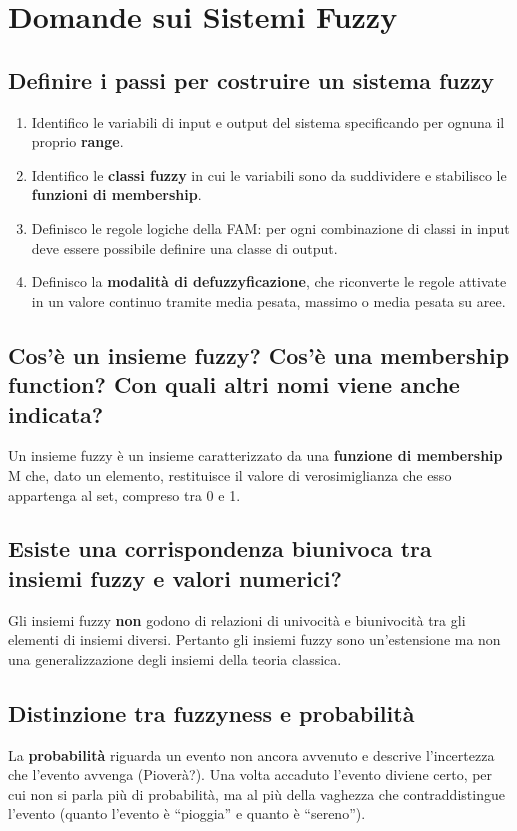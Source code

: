 \documentclass[\main/main.tex]{subfiles}
\begin{document}
\section{Domande sui Sistemi Fuzzy}
\subsection{Definire i passi per costruire un sistema fuzzy}
\begin{enumerate}
  \item Identifico le variabili di input e output del sistema specificando per ognuna il proprio \textbf{range}.
  \item Identifico le \textbf{classi fuzzy} in cui le variabili sono da suddividere e stabilisco le \textbf{funzioni di membership}.
  \item Definisco le regole logiche della FAM: per ogni combinazione di classi in input deve essere possibile definire una classe di output.
  \item Definisco la \textbf{modalità di defuzzyficazione}, che riconverte le regole attivate in un valore continuo tramite media pesata, massimo o media pesata su aree.
\end{enumerate}

\subsection{Cos'è un insieme fuzzy? Cos'è una membership function? Con quali altri nomi viene anche indicata?}
Un insieme fuzzy è un insieme caratterizzato da una \textbf{funzione di membership} M che, dato un elemento, restituisce il valore di verosimiglianza che esso appartenga al set, compreso tra 0 e 1.

\subsection{Esiste una corrispondenza biunivoca tra insiemi fuzzy e valori numerici?}
Gli insiemi fuzzy \textbf{non} godono di relazioni di univocità e biunivocità tra gli elementi di insiemi diversi. Pertanto gli insiemi fuzzy sono un'estensione ma non una generalizzazione degli insiemi della teoria classica.

\subsection{Distinzione tra fuzzyness e probabilità}
La \textbf{probabilità} riguarda un evento non ancora avvenuto e descrive l'incertezza che l'evento avvenga (Pioverà?). Una volta accaduto l'evento diviene certo, per cui non si parla più di probabilità, ma al più della vaghezza che contraddistingue l'evento (quanto l'evento è ``pioggia'' e quanto è ``sereno'').
\end{document}
